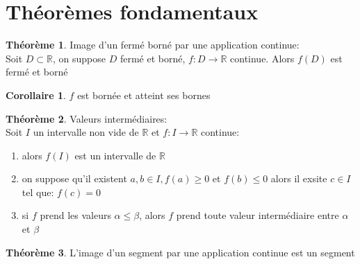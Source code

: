 \documentclass[fleqn]{article}
\theoremstyle{definition} \newtheorem*{defi}{D\'efinition}
\theoremstyle{definition} \newtheorem*{theo}{Th\'eor\`eme}
\theoremstyle{definition} \newtheorem*{coro}{Corollaire}
\begin{document}
\section{Th\'eor\`emes fondamentaux}
\begin{theo}
	Image d'un ferm\'e born\'e par une application continue: \\
	Soit $D \subset \mathbb{R}$, on suppose $D$ ferm\'e et born\'e, $f:D \rightarrow \mathbb{R}$ continue. Alors $f(D)$ est ferm\'e et born\'e
	\begin{coro}
		$f$ est born\'ee et atteint ses bornes
	\end{coro}
\end{theo}
\begin{theo}
	Valeurs interm\'ediaires: \\
	Soit $I$ un intervalle non vide de $\mathbb{R}$ et $f:I \rightarrow \mathbb{R}$ continue:
	\begin{enumerate}
		\item alors $f(I)$ est un intervalle de $\mathbb{R}$
		\item on suppose qu'il existent $a,b \in I, f(a) \geq 0$ et $f(b) \leq 0$ alors il exsite $c \in I$ tel que: $f(c) = 0$
		\item si $f$ prend les valeurs $\alpha \leq \beta$, alors $f$ prend toute valeur interm\'ediaire entre $\alpha$ et $\beta$
	\end{enumerate}
\end{theo}
\begin{theo}
	L'image d'un segment par une application continue est un segment
\end{theo}
\end{document}
